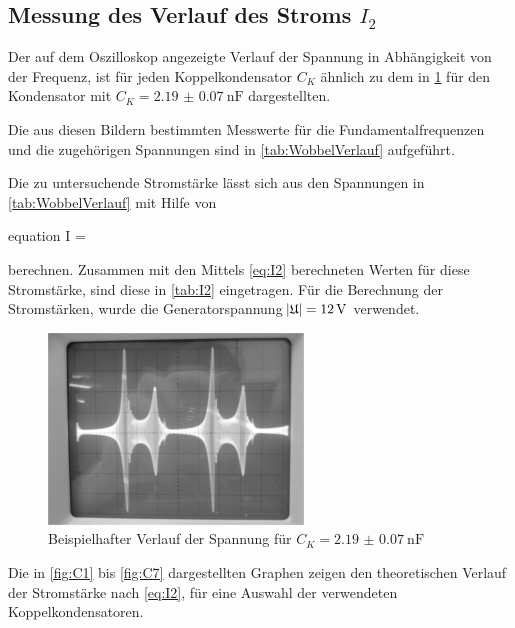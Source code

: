 	
	
\subsection{Messung des Verlauf des Stroms $I_{2}$} \label{sec:Auswertung_Wobbel}
	
	Der auf dem Oszilloskop angezeigte Verlauf der Spannung in Abhängigkeit von der Frequenz, ist für jeden 
	Koppelkondensator $C_{K}$ ähnlich zu dem in \cref{fig:WobbelVerlauf} für den Kondensator mit 
	$C_{K} = \SI{2.19(7)}{\nano\farad}$ dargestellten.
	

	Die aus diesen Bildern bestimmten Messwerte für die Fundamentalfrequenzen und die zugehörigen Spannungen
	sind in \cref{tab:WobbelVerlauf} aufgeführt.  

	
	
	Die zu untersuchende Stromstärke lässt sich aus den Spannungen in \cref{tab:WobbelVerlauf} mit Hilfe von
	\begin{empheq}{equation}
		I =  
	\end{empheq}  
	berechnen. Zusammen mit den Mittels \cref{eq:I2} berechneten Werten für diese Stromstärke, sind diese in
	\cref{tab:I2} eingetragen. Für die Berechnung der Stromstärken, wurde die Generatorspannung $\envert{\mathfrak{U}} = \SI{12}{\volt}$ verwendet. 
	
		
	
	\begin{figure}
			\centering
			\includegraphics[scale=0.8]{Grafiken/Kondensator2.jpg}
			\caption{Beispielhafter Verlauf der Spannung für $C_{K} = \SI{2.19(7)}{\nano\farad}$ }
			\label{fig:WobbelVerlauf}
	\end{figure}
	
	Die in \cref{fig:C1} bis \ref{fig:C7} dargestellten Graphen zeigen den theoretischen Verlauf der Stromstärke nach 
	\cref{eq:I2}, für eine Auswahl der verwendeten Koppelkondensatoren.
	
